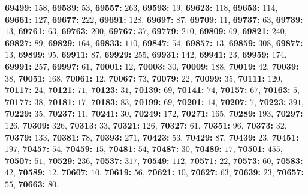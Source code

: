 \textsf{\bfseries 69499:} $158$, \textsf{\bfseries 69539:} $53$, \textsf{\bfseries 69557:} $263$, \textsf{\bfseries 69593:} $19$, \textsf{\bfseries 69623:} $118$, \textsf{\bfseries 69653:} $114$, \textsf{\bfseries 69661:} $127$, \textsf{\bfseries 69677:} $222$, \textsf{\bfseries 69691:} $128$, \textsf{\bfseries 69697:} $87$, \textsf{\bfseries 69709:} $11$, \textsf{\bfseries 69737:} $63$, \textsf{\bfseries 69739:} $13$, \textsf{\bfseries 69761:} $63$, \textsf{\bfseries 69763:} $200$, \textsf{\bfseries 69767:} $37$, \textsf{\bfseries 69779:} $210$, \textsf{\bfseries 69809:} $69$, \textsf{\bfseries 69821:} $240$, \textsf{\bfseries 69827:} $89$, \textsf{\bfseries 69829:} $164$, \textsf{\bfseries 69833:} $110$, \textsf{\bfseries 69847:} $54$, \textsf{\bfseries 69857:} $13$, \textsf{\bfseries 69859:} $308$, \textsf{\bfseries 69877:} $13$, \textsf{\bfseries 69899:} $95$, \textsf{\bfseries 69911:} $87$, \textsf{\bfseries 69929:} $255$, \textsf{\bfseries 69931:} $142$, \textsf{\bfseries 69941:} $23$, \textsf{\bfseries 69959:} $174$, \textsf{\bfseries 69991:} $257$, \textsf{\bfseries 69997:} $61$, \textsf{\bfseries 70001:} $12$, \textsf{\bfseries 70003:} $30$, \textsf{\bfseries 70009:} $188$, \textsf{\bfseries 70019:} $42$, \textsf{\bfseries 70039:} $38$, \textsf{\bfseries 70051:} $168$, \textsf{\bfseries 70061:} $12$, \textsf{\bfseries 70067:} $73$, \textsf{\bfseries 70079:} $22$, \textsf{\bfseries 70099:} $35$, \textsf{\bfseries 70111:} $120$, \textsf{\bfseries 70117:} $24$, \textsf{\bfseries 70121:} $71$, \textsf{\bfseries 70123:} $31$, \textsf{\bfseries 70139:} $69$, \textsf{\bfseries 70141:} $74$, \textsf{\bfseries 70157:} $67$, \textsf{\bfseries 70163:} $5$, \textsf{\bfseries 70177:} $38$, \textsf{\bfseries 70181:} $17$, \textsf{\bfseries 70183:} $83$, \textsf{\bfseries 70199:} $69$, \textsf{\bfseries 70201:} $14$, \textsf{\bfseries 70207:} $7$, \textsf{\bfseries 70223:} $391$, \textsf{\bfseries 70229:} $35$, \textsf{\bfseries 70237:} $11$, \textsf{\bfseries 70241:} $30$, \textsf{\bfseries 70249:} $172$, \textsf{\bfseries 70271:} $165$, \textsf{\bfseries 70289:} $193$, \textsf{\bfseries 70297:} $126$, \textsf{\bfseries 70309:} $326$, \textsf{\bfseries 70313:} $33$, \textsf{\bfseries 70321:} $126$, \textsf{\bfseries 70327:} $61$, \textsf{\bfseries 70351:} $96$, \textsf{\bfseries 70373:} $32$, \textsf{\bfseries 70379:} $133$, \textsf{\bfseries 70381:} $78$, \textsf{\bfseries 70393:} $271$, \textsf{\bfseries 70423:} $53$, \textsf{\bfseries 70429:} $87$, \textsf{\bfseries 70439:} $23$, \textsf{\bfseries 70451:} $197$, \textsf{\bfseries 70457:} $54$, \textsf{\bfseries 70459:} $15$, \textsf{\bfseries 70481:} $54$, \textsf{\bfseries 70487:} $30$, \textsf{\bfseries 70489:} $17$, \textsf{\bfseries 70501:} $455$, \textsf{\bfseries 70507:} $51$, \textsf{\bfseries 70529:} $236$, \textsf{\bfseries 70537:} $317$, \textsf{\bfseries 70549:} $112$, \textsf{\bfseries 70571:} $22$, \textsf{\bfseries 70573:} $60$, \textsf{\bfseries 70583:} $42$, \textsf{\bfseries 70589:} $12$, \textsf{\bfseries 70607:} $10$, \textsf{\bfseries 70619:} $56$, \textsf{\bfseries 70621:} $10$, \textsf{\bfseries 70627:} $63$, \textsf{\bfseries 70639:} $23$, \textsf{\bfseries 70657:} $55$, \textsf{\bfseries 70663:} $80$, 
